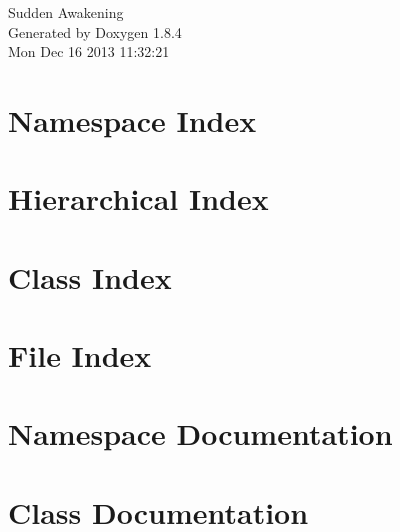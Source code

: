 \documentclass[twoside]{book}
\newcommand{\clearemptydoublepage}{%
  \newpage{\pagestyle{empty}\cleardoublepage}%
}
\begin{document}
\hypersetup{pageanchor=false}
\begin{titlepage}
\vspace*{7cm}
\begin{center}%
{\Large Sudden Awakening }\\
\vspace*{1cm}
{\large Generated by Doxygen 1.8.4}\\
\vspace*{0.5cm}
{\small Mon Dec 16 2013 11:32:21}\\
\end{center}
\end{titlepage}
\clearemptydoublepage
\tableofcontents
\clearemptydoublepage
{}
\hypersetup{pageanchor=true}

\chapter{Namespace Index}

\chapter{Hierarchical Index}

\chapter{Class Index}

\chapter{File Index}

\chapter{Namespace Documentation}



\chapter{Class Documentation}





































\end{document}
